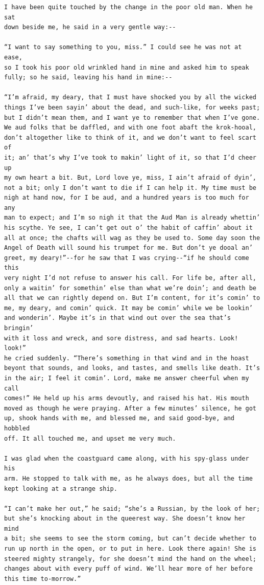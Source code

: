 \documentclass{article}
\begin{document}
\begin{verbatim}
I have been quite touched by the change in the poor old man. When he sat
down beside me, he said in a very gentle way:--

“I want to say something to you, miss.” I could see he was not at ease,
so I took his poor old wrinkled hand in mine and asked him to speak
fully; so he said, leaving his hand in mine:--

“I’m afraid, my deary, that I must have shocked you by all the wicked
things I’ve been sayin’ about the dead, and such-like, for weeks past;
but I didn’t mean them, and I want ye to remember that when I’ve gone.
We aud folks that be daffled, and with one foot abaft the krok-hooal,
don’t altogether like to think of it, and we don’t want to feel scart of
it; an’ that’s why I’ve took to makin’ light of it, so that I’d cheer up
my own heart a bit. But, Lord love ye, miss, I ain’t afraid of dyin’,
not a bit; only I don’t want to die if I can help it. My time must be
nigh at hand now, for I be aud, and a hundred years is too much for any
man to expect; and I’m so nigh it that the Aud Man is already whettin’
his scythe. Ye see, I can’t get out o’ the habit of caffin’ about it
all at once; the chafts will wag as they be used to. Some day soon the
Angel of Death will sound his trumpet for me. But don’t ye dooal an’
greet, my deary!”--for he saw that I was crying--“if he should come this
very night I’d not refuse to answer his call. For life be, after all,
only a waitin’ for somethin’ else than what we’re doin’; and death be
all that we can rightly depend on. But I’m content, for it’s comin’ to
me, my deary, and comin’ quick. It may be comin’ while we be lookin’
and wonderin’. Maybe it’s in that wind out over the sea that’s bringin’
with it loss and wreck, and sore distress, and sad hearts. Look! look!”
he cried suddenly. “There’s something in that wind and in the hoast
beyont that sounds, and looks, and tastes, and smells like death. It’s
in the air; I feel it comin’. Lord, make me answer cheerful when my call
comes!” He held up his arms devoutly, and raised his hat. His mouth
moved as though he were praying. After a few minutes’ silence, he got
up, shook hands with me, and blessed me, and said good-bye, and hobbled
off. It all touched me, and upset me very much.

I was glad when the coastguard came along, with his spy-glass under his
arm. He stopped to talk with me, as he always does, but all the time
kept looking at a strange ship.

“I can’t make her out,” he said; “she’s a Russian, by the look of her;
but she’s knocking about in the queerest way. She doesn’t know her mind
a bit; she seems to see the storm coming, but can’t decide whether to
run up north in the open, or to put in here. Look there again! She is
steered mighty strangely, for she doesn’t mind the hand on the wheel;
changes about with every puff of wind. We’ll hear more of her before
this time to-morrow.”





\end{verbatim}
\end{document}
